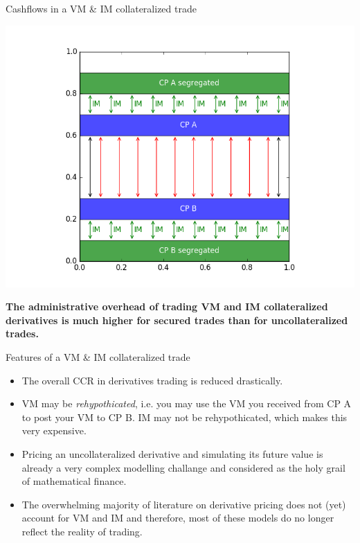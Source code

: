 \documentclass[t]{beamer}
\begin{document}
\begin{frame}{Cashflows in a VM \& IM collateralized trade}
	\begin{center}
		\includegraphics[scale=0.4]{pics/cashflows_im_vm_coll.png}

		\textbf{The administrative overhead of trading VM and IM collateralized derivatives is much higher for secured trades than for uncollateralized trades.}
	\end{center}
\end{frame}

\begin{frame}{Features of a VM \& IM collateralized trade}
	\begin{itemize}
		\item
			The overall CCR in derivatives trading is reduced drastically.
		\item
			VM may be \emph{rehypothicated}, i.e. you may use the VM you received from CP A to post your VM to CP B. IM may not be rehypothicated, which makes this very expensive.
		\item
			Pricing an uncollateralized derivative and simulating its future value is already a very complex modelling challange and considered as the holy grail of mathematical finance.
		\item
			The overwhelming majority of literature on derivative pricing does not (yet) account for VM and IM and therefore, most of these models do no longer reflect the reality of trading.
	\end{itemize}
\end{frame}
\end{document}
